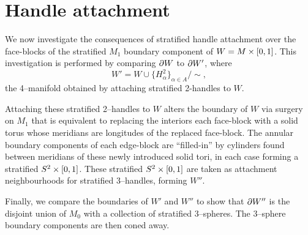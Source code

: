 \section{Handle attachment}

We now investigate the consequences of stratified handle attachment over the face-blocks of the stratified $M_1$ boundary component of $W=M\times[0,1]$.
This investigation is performed by comparing $\partial W$ to $\partial W'$, where
\[
	W' = W\cup\{H_\alpha^2\}_{\alpha\in A} / \sim,
\]
the 4--manifold obtained by attaching stratified 2-handles to $W$.

Attaching these stratified 2--handles to $W$ alters the boundary of $W$ via surgery on $M_1$ that is equivalent to replacing the interiors each face-block with a solid torus whose meridians are longitudes of the replaced face-block.
The annular boundary components of each edge-block are ``filled-in'' by cylinders found between meridians of these newly introduced solid tori, in each case forming a stratified $S^2\times[0,1]$.
These stratified $S^2\times[0,1]$ are taken as attachment neighbourhoods for stratified 3--handles, forming $W''$.

Finally, we compare the boundaries of $W'$ and $W''$ to show that $\partial W''$ is the disjoint union of  $M_0$ with a collection of stratified 3--spheres.
The 3--sphere boundary components are then coned away.
